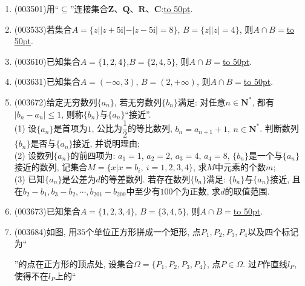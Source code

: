 \documentclass[10pt,a4paper]{article}
\newcommand{\blank}[1]{\underline{\hbox to #1pt{}}}
\begin{document}
\begin{enumerate}[1.]
\begin{center}
\end{center}
\item {\tiny (003501)}用``$\subseteq$''连接集合$\mathbf{Z}$、$\mathbf{Q}$、$\mathbf{R}$、$\mathbf{C}$:\blank{50}.
\item {\tiny (003533)}若集合$A=\{z||z+5\mathrm{i}|-|z-5\mathrm{i}|=8\}$, $B=\{z||z|=4\}$, 则$A\cap B=$\blank{50}.
\item {\tiny (003610)}已知集合$A=\{1,2,4\}$,$B=\{2,4,5\}$, 则$A\cap B=$\blank{50}.
\item {\tiny (003631)}已知集合$A=(-\infty,3)$, $B=(2,+\infty)$, 则$A\cap B=$\blank{50}.
\item {\tiny (003672)}给定无穷数列$\{a_n\}$, 若无穷数列$\{b_n\}$满足: 对任意$n\in \mathbf{N}^*$, 都有$|b_n-a_n|\le 1$, 则称$\{b_n\}$与$\{a_n\}$``接近''.\\
(1) 设$\{a_n\}$是首项为$1$, 公比为$\dfrac{1}{2}$的等比数列, $b_n=a_{n+1}+1, \ n\in \mathbf{N}^*$. 判断数列$\{b_n\}$是否与$\{a_n\}$接近, 并说明理由;\\
(2) 设数列$\{a_n\}$的前四项为: $a_1=1$, $a_2=2$, $a_3=4$, $a_4=8$, $\{b_n\}$是一个与$\{a_n\}$接近的数列, 记集合$M=\{x|x=b_i, \ i=1,2,3,4\}$, 求$M$中元素的个数$m$;\\
(3) 已知$\{a_n\}$是公差为$d$的等差数列. 若存在数列$\{b_n\}$满足: $\{b_n\}$与$\{a_n\}$接近, 且在$b_2-b_1,b_3-b_2,\cdots,b_{201}-b_{200}$中至少有$100$个为正数, 求$d$的取值范围.
\item {\tiny (003673)}已知集合$A=\{1,2,3,4\}$, $B=\{3,4,5\}$, 则$A\cap B=$\blank{50}.
\item {\tiny (003684)}如图, 用$35$个单位正方形拼成一个矩形, 点$P_1,P_2,P_3,P_4$以及四个标记为``''的点在正方形的顶点处, 设集合$\Omega=\{P_1,P_2,P_3,P_4\}$, 点$P\in \Omega$. 过$P$作直线$l_P$, 使得不在$l_P$上的``\begin{tikzpicture}

\end{tikzpicture}
\end{enumerate}
\end{document}
